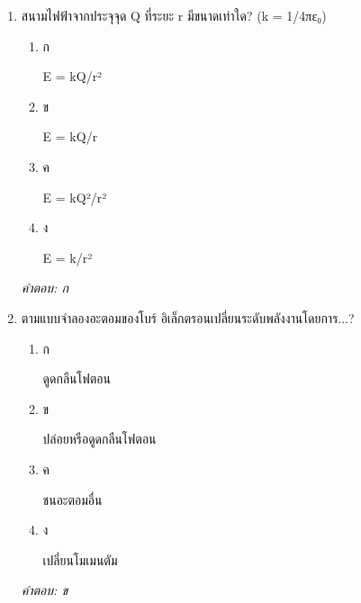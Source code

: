 \documentclass[12pt]{article}
\begin{document}
\begin{enumerate}[label=\arabic*., itemsep=0.5\baselineskip, topsep=0.5\baselineskip, leftmargin=*]
\item สนามไฟฟ้าจากประจุจุด Q ที่ระยะ r มีขนาดเท่าใด? (k = 1/4πε₀)
\begin{enumerate}[label=\alph*)., itemsep=0.3\baselineskip, topsep=0.3\baselineskip]
\item ก\ 
\begin{minipage}[t]{0.9\linewidth}
\raggedright E = kQ/r²
\end{minipage}
\item ข\ 
\begin{minipage}[t]{0.9\linewidth}
\raggedright E = kQ/r
\end{minipage}
\item ค\ 
\begin{minipage}[t]{0.9\linewidth}
\raggedright E = kQ²/r²
\end{minipage}
\item ง\ 
\begin{minipage}[t]{0.9\linewidth}
\raggedright E = k/r²
\end{minipage}
\end{enumerate}
\vspace{-0.3\baselineskip}
\begin{small}
\textit{คำตอบ: ก}
\end{small}

\item ตามแบบจำลองอะตอมของโบร์ อิเล็กตรอนเปลี่ยนระดับพลังงานโดยการ...?
\begin{enumerate}[label=\alph*)., itemsep=0.3\baselineskip, topsep=0.3\baselineskip]
\item ก\ 
\begin{minipage}[t]{0.9\linewidth}
\raggedright ดูดกลืนโฟตอน
\end{minipage}
\item ข\ 
\begin{minipage}[t]{0.9\linewidth}
\raggedright ปล่อยหรือดูดกลืนโฟตอน
\end{minipage}
\item ค\ 
\begin{minipage}[t]{0.9\linewidth}
\raggedright ชนอะตอมอื่น
\end{minipage}
\item ง\ 
\begin{minipage}[t]{0.9\linewidth}
\raggedright เปลี่ยนโมเมนตัม
\end{minipage}
\end{enumerate}
\vspace{-0.3\baselineskip}
\begin{small}
\textit{คำตอบ: ข}
\end{small}


\end{enumerate}
\end{document}
